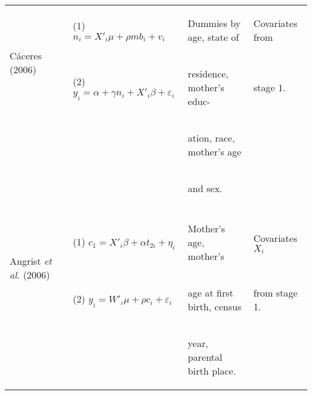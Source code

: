 \documentclass{article}[11pt,subeqn]
\begin{document}
\begin{spacing}{1.25}
\begin{center}
\begin{rotate}{90}
\begin{tabular}{lp{4mm}lll}
\multirow{2}{*}{C\'aceres (2006)} & &
(1) $n_i=X'_i\mu + \rho mb_i + v_i$ &
\begin{small}Dummies by age, state of\end{small}&
\begin{small}Covariates from\end{small}
\\
& &
(2) $y_i=\alpha + \gamma n_i + X'_i\beta + \varepsilon_i$ &
\begin{small}residence, mother's educ- \end{small}&
\begin{small}stage 1.\end{small}
\\
& & &
\begin{small}ation, race, mother's age\end{small}&
\\
& & &
\begin{small}and sex.\end{small}&
\\
\begin{footnotesize}\end{footnotesize}&\begin{footnotesize}\end{footnotesize}&\begin{footnotesize}\end{footnotesize}&\begin{footnotesize}\end{footnotesize}&\begin{footnotesize}\end{footnotesize}\\
\multirow{2}{*}{Angrist \emph{et al.} (2006)} &  &
(1)  $c_1=X'_i\beta+\alpha t_{2i}+\eta_i$ &
\begin{small}Mother's age, mother's \end{small} & 
\begin{small}Covariates $X_i$\end{small}
\\
& &
(2) $y_i=W'_i\mu+\rho c_i + \varepsilon_i$ &  
\begin{small}age at first birth, census \end{small} &
\begin{small}from stage 1.\end{small}
\\
& & &
\begin{small}year, parental birth place.\end{small}&
\\

\end{tabular}
\end{rotate}
\end{center}
\end{spacing}
\end{document}
